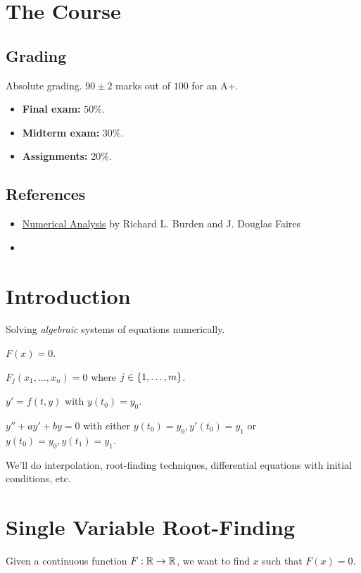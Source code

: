 
\section{The Course} \label{sec:course}
\subsection{Grading} \label{sec:grading}
Absolute grading.
$90 \pm 2$ marks out of $100$ for an A+.
\begin{itemize}
    \item \textbf{Final exam:} $50\%$.
    \item \textbf{Midterm exam:} $30\%$.
    \item \textbf{Assignments:} $20\%$.
\end{itemize}
\subsection{References} \label{sec:references}
\begin{itemize}
    \item \href{https://faculty.ksu.edu.sa/sites/default/files/numerical_analysis_9th.pdf}
        {Numerical Analysis} by Richard L. Burden and J. Douglas Faires
    \item 
\end{itemize}
\section{Introduction} \label{sec:intro}
Solving \emph{algebraic} systems of equations numerically.
\begin{examplelist}
    \item $F(x) = 0$.
    \item $F_{j}(x_{1}, \dots, x_{n}) = 0$ where $j \in \set{1, \dots, m}$.
    \item $y' = f(t, y)$ with $y(t_{0}) = y_{0}$.
    \item $y'' + a y' + b y = 0$ with either
        $y(t_{0}) = y_{0}, y'(t_{0}) = y_{1}$ or
        $y(t_{0}) = y_{0}, y(t_{1}) = y_{1}$.
\end{examplelist}

We'll do interpolation, root-finding techniques, differential equations with
initial conditions, etc.

\section{Single Variable Root-Finding} \label{sec:root-finding}
Given a continuous function $F : \mathbb{R} \to \mathbb{R}$, we want to find $x$ such that
$F(x) = 0$.

